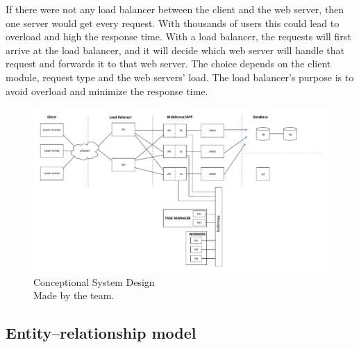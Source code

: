 
If there were not any load balancer between the client and the web server, then one server would get every request. With thousands of users this could lead to overload and high the response time. With a load balancer, the requests will first arrive at the load balancer, and it will decide which web server will handle that request and forwards it to that web server. The choice depends on the client module, request type and the web servers' load. The load balancer's purpose is to avoid overload and minimize the response time.
 
 \begin{figure}[!htbp]
 	\includegraphics[width=0.95\textheight, angle=90]{figures/atfogo_rendszerterv_teljes.pdf}
 	\caption[Conceptional System Design]{Conceptional System Design\\Made by the team.}
 	\label{fig:conceptional-system-design}
 \end{figure}
 
 
 \newpage
\subsection{Entity–relationship model}
\label{ER-model}

